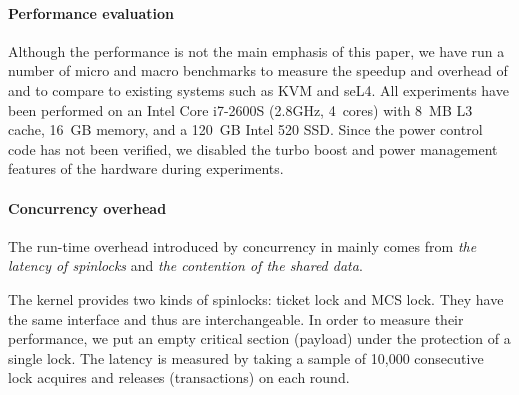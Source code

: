 
\vspace*{-10pt}
\paragraph{Performance evaluation} Although the performance is not the main
emphasis of this paper, we have run a number of micro and macro
benchmarks to measure the speedup and overhead of {\mCTOS} and to
compare {\mCTOS} to existing systems such as KVM and seL4. All
experiments have been performed on an Intel Core i7-2600S (2.8GHz,
4~cores) with 8~MB L3 cache, 16~GB memory, and a 120~GB
Intel 520 SSD. Since the power control code has not been verified, we
disabled the turbo boost and power management features of the hardware
during experiments.

\vspace*{-10pt}
\paragraph{Concurrency overhead} The run-time overhead introduced by concurrency
in {\mCTOS} mainly comes from \emph{the latency of spinlocks} and
\emph{the contention of the shared data}.

The {\mCTOS} kernel provides two kinds of spinlocks: ticket lock and
MCS lock. They have the same interface and thus are
interchangeable. In order to measure their performance, we put an
empty critical section (payload) under the protection of a single
lock. The latency is measured by taking a sample of 10,000 consecutive
lock acquires and releases (transactions) on each round.

